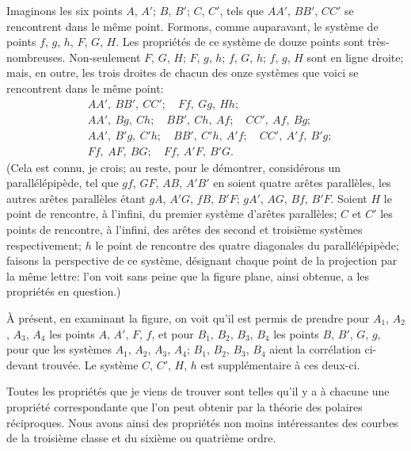 \documentclass[12pt,a4paper]{article}
\begin{document}
Imaginons les six points $A$, $A'$; $B$, $B'$; $C$, $C'$, tels que $AA'$, $BB'$, $CC'$ se rencontrent dans le m\^eme point. Formons, comme auparavant, le syst\`eme de points $f$, $g$, $h$, $F$, $G$, $H$. Les propri\'et\'es de ce syst\`eme de douze points sont tr\`es-nombreuses. Non-seulement $F$, $G$, $H$; $F$, $g$, $h$; $f$, $G$, $h$; $f$, $g$, $H$ sont en ligne droite; mais, en outre, les trois droites de chacun des onze syst\`emes que voici se rencontrent dans le m\^eme point:
\begin{align*}
&AA',\ BB',\ CC';\quad Ff,\ Gg,\ Hh;\\
&AA',\ Bg,\ Ch;\quad BB',\ Ch,\ Af;\quad CC',\ Af,\ Bg;\\
&AA',\ B'g,\ C'h;\quad BB',\ C'h,\ A'f;\quad CC',\ A'f,\ B'g;\\
&Ff,\ AF,\ BG;\quad Ff,\ A'F,\ B'G.
\end{align*}
(Cela est connu, je crois; au reste, pour le d\'emontrer, consid\'erons un parall\'el\'epip\`ede, tel que $gf$, $GF$, $AB$, $A'B'$ en soient quatre ar\^etes parall\`eles, les autres ar\^etes parall\`eles \'etant $gA$, $A'G$, $fB$, $B'F$; $gA'$, $AG$, $Bf$, $B'F$. Soient $H$ le point de rencontre, \`a l'infini, du premier syst\`eme d'ar\^etes parall\`eles; $C$ et $C'$ les points de rencontre, \`a l'infini, des ar\^etes des second et troisi\`eme syst\`emes respectivement; $h$ le point de rencontre des quatre diagonales du parall\'el\'epip\`ede; faisons la perspective de ce syst\`eme, d\'esignant chaque point de la projection par la m\^eme lettre: l'on voit sans peine que la figure plane, ainsi obtenue, a les propri\'et\'es en question.)

\newpage
\setcounter{page}{187}

\`A pr\'esent, en examinant la figure, on voit qu'il est permis de prendre pour $A_1$, $A_2$, $A_3$, $A_4$ les points $A$, $A'$, $F$, $f$, et pour $B_1$, $B_2$, $B_3$, $B_4$ les points $B$, $B'$, $G$, $g$, pour que les syst\`emes $A_1$, $A_2$, $A_3$, $A_4$; $B_1$, $B_2$, $B_3$, $B_4$ aient la corr\'elation ci-devant trouv\'ee. Le syst\`eme $C$, $C'$, $H$, $h$ est suppl\'ementaire \`a ces deux-ci.

Toutes les propri\'et\'es que je viens de trouver sont telles qu'il y a \`a chacune une propri\'et\'e correspondante que l'on peut obtenir par la th\'eorie des polaires r\'eciproques. Nous avons ainsi des propri\'et\'es non moins int\'eressantes des courbes de la troisi\`eme classe et du sixi\`eme ou quatri\`eme ordre.
\end{document}
